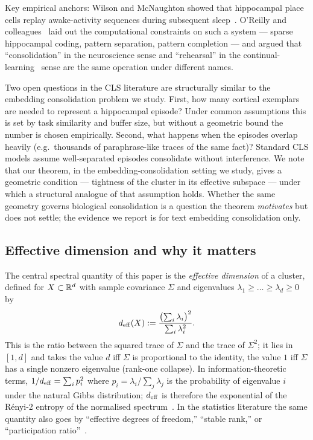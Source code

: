 Key empirical anchors: Wilson and McNaughton showed that hippocampal
place cells replay awake-activity sequences during subsequent
sleep~\cite{wilson1994reactivation}. O'Reilly and
colleagues~\cite{oreillyHippocampus2014} laid out the computational
constraints on such a system --- sparse hippocampal coding, pattern
separation, pattern completion --- and argued that ``consolidation'' in
the neuroscience sense and ``rehearsal'' in the
continual-learning~\cite{mccloskey1989cf,robinsReplay1995} sense are the
same operation under different names.

Two open questions in the CLS literature are structurally similar to
the embedding consolidation problem we study. First, how many cortical
exemplars are needed to represent a hippocampal episode? Under common
assumptions this is set by task similarity and buffer size, but without
a geometric bound the number is chosen empirically. Second, what
happens when the episodes overlap heavily (e.g.\ thousands of
paraphrase-like traces of the same fact)? Standard CLS models assume
well-separated episodes consolidate without interference. We note that
our theorem, in the embedding-consolidation setting we study, gives a
geometric condition --- tightness of the cluster in its effective
subspace --- under which a structural analogue of that assumption
holds. Whether the same geometry governs biological consolidation is a
question the theorem \emph{motivates} but does not settle; the
evidence we report is for text embedding consolidation only.

\subsection{Effective dimension and why it matters}
\label{sec:background:deff}

The central spectral quantity of this paper is the \emph{effective
dimension} of a cluster, defined for $X \subset \mathbb{R}^d$ with sample
covariance $\Sigma$ and eigenvalues $\lambda_1 \geq \ldots \geq
\lambda_d \geq 0$ by
\begin{equation}
{d_{\mathrm{eff}}}(X) := \frac{\bigl(\sum_i \lambda_i\bigr)^2}{\sum_i \lambda_i^2}.
\label{eq:deff_def}
\end{equation}
This is the ratio between the squared trace of $\Sigma$ and the trace
of $\Sigma^2$; it lies in $[1, d]$ and takes the value $d$ iff $\Sigma$
is proportional to the identity, the value $1$ iff $\Sigma$ has a single
nonzero eigenvalue (rank-one collapse). In information-theoretic terms,
$1/{d_{\mathrm{eff}}} = \sum_i p_i^2$ where $p_i = \lambda_i / \sum_j \lambda_j$ is
the probability of eigenvalue $i$ under the natural Gibbs distribution;
${d_{\mathrm{eff}}}$ is therefore the exponential of the R\'enyi-2 entropy of the
normalised spectrum~\cite{royVetterli2007}. In the
statistics literature the same quantity also goes by ``effective
degrees of freedom,''
``stable rank,'' or ``participation
ratio''~\cite{vershynin2018hdp,ledoux2001concentration}.

